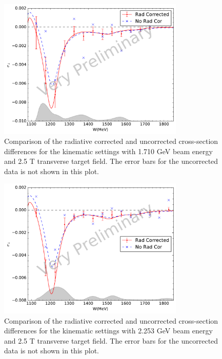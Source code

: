 \begin{figure}[p!]
  \centering
  \includegraphics[width=0.79\textwidth]{figs/xsdiff-model-17102590.pdf}
  \caption[Cross-section differences with $E=1.710$ GeV and $B=2.5$ T.]{Comparison of the radiative corrected and uncorrected cross-section differences for the kinematic settings with 1.710 GeV beam energy and 2.5 T transverse target field. The error bars for the uncorrected data is not shown in this plot. \label{C8S3F2}}
\end{figure}

\begin{figure}[p!]
  \centering
  \includegraphics[width=0.79\textwidth]{figs/xsdiff-model-22532590.pdf}
  \caption[Cross-section differences with $E=2.253$ GeV and $B=2.5$ T.]{Comparison of the radiative corrected and uncorrected cross-section differences for the kinematic settings with 2.253 GeV beam energy and 2.5 T transverse target field. The error bars for the uncorrected data is not shown in this plot. \label{C8S3F3}}
\end{figure}

